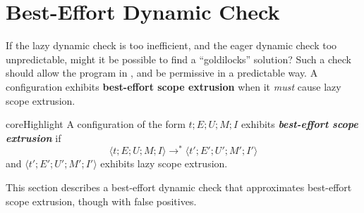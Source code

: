 \section{Best-Effort Dynamic Check}\label{section:best-effort-check}
If the lazy dynamic check is too inefficient, and the eager dynamic check too unpredictable, might it be possible to find a ``goldilocks'' solution? Such a check should allow the program in , and be permissive in a predictable way. A configuration exhibits \textbf{best-effort scope extrusion} when it \textit{must} cause lazy scope extrusion.
\begin{definition}{coreHighlight} A \coreLang{} configuration of the form $t;E;U;M;I$
exhibits \textbf{\emph{best-effort scope extrusion}} if 
\[ \langle t;E;U;M;I\rangle \to^{*} \langle t';E';U';M';I'\rangle\]
and $\langle t';E';U';M';I'\rangle$ exhibits lazy scope extrusion.
\end{definition}

This section describes a best-effort dynamic check that approximates best-effort scope extrusion, though with false positives. 

